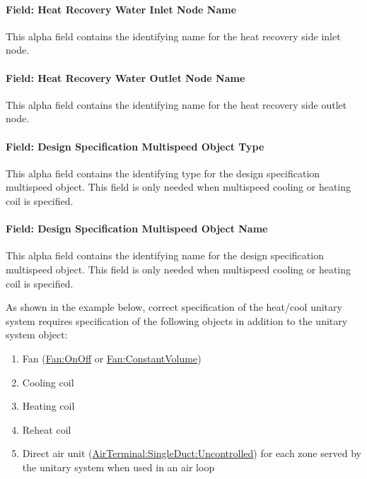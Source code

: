 \paragraph{Field: Heat Recovery Water Inlet Node Name}\label{field-heat-recovery-water-inlet-node-name-000}

This alpha field contains the identifying name for the heat recovery side inlet node.

\paragraph{Field: Heat Recovery Water Outlet Node Name}\label{field-heat-recovery-water-outlet-node-name-000}

This alpha field contains the identifying name for the heat recovery side outlet node.

\paragraph{Field: Design Specification Multispeed Object Type}\label{field-design-specification-multispeed-object-type}

This alpha field contains the identifying type for the design specification multispeed object. This field is only needed when multispeed cooling or heating coil is specified.

\paragraph{Field: Design Specification Multispeed Object Name}\label{field-design-specification-multispeed-object-name}

This alpha field contains the identifying name for the design specification multispeed object. This field is only needed when multispeed cooling or heating coil is specified.

As shown in the example below, correct specification of the heat/cool unitary system requires specification of the following objects in addition to the unitary system object:

\begin{enumerate}
\def\labelenumi{\arabic{enumi})}
\item
  Fan (\hyperref[fanonoff]{Fan:OnOff} or \hyperref[fanconstantvolume]{Fan:ConstantVolume})
\item
  Cooling coil
\item
  Heating coil
\item
  Reheat coil
\item
  Direct air unit (\hyperref[airterminalsingleductuncontrolled]{AirTerminal:SingleDuct:Uncontrolled}) for each zone served by the unitary system when used in an air loop
\end{enumerate}

